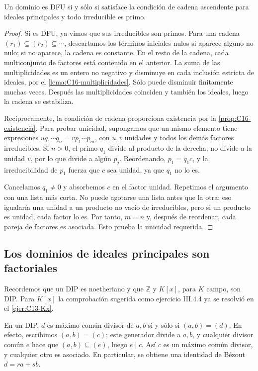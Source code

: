 \begin{teo}\label{teo:C16-criterio}
Un dominio es DFU si y sólo si satisface la condición de cadena ascendente para ideales principales y todo irreducible es primo.
\end{teo}
\begin{proof}
Si es DFU, ya vimos que sus irreducibles son primos. Para una cadena $(r_1)\subseteq(r_2)\subseteq\cdots$, descartamos los términos iniciales nulos si aparece alguno no nulo; si no aparece, la cadena es constante. En el resto de la cadena, cada multiconjunto de factores está contenido en el anterior. La suma de las multiplicidades es un entero no negativo y disminuye en cada inclusión estricta de ideales, por el \cref{lema:C16-multiplicidades}. Sólo puede disminuir finitamente muchas veces. Después las multiplicidades coinciden y también los ideales, luego la cadena se estabiliza.

Recíprocamente, la condición de cadena proporciona existencia por la \cref{prop:C16-existencia}. Para probar unicidad, supongamos que un mismo elemento tiene expresiones $u q_1\cdots q_n=v p_1\cdots p_m$, con $u,v$ unidades y todos los demás factores irreducibles. Si $n>0$, el primo $q_1$ divide al producto de la derecha; no divide a la unidad $v$, por lo que divide a algún $p_j$. Reordenando, $p_1=q_1c$, y la irreducibilidad de $p_1$ fuerza que $c$ sea unidad, ya que $q_1$ no lo es.

Cancelamos $q_1\ne0$ y absorbemos $c$ en el factor unidad. Repetimos el argumento con una lista más corta. No puede agotarse una lista antes que la otra: eso igualaría una unidad a un producto no vacío de irreducibles, pero si un producto es unidad, cada factor lo es. Por tanto, $m=n$ y, después de reordenar, cada pareja de factores es asociada. Esto prueba la unicidad requerida.
\end{proof}

\subsection{Los dominios de ideales principales son factoriales}
Recordemos que un DIP es noetheriano y que $\mathbb Z$ y $K[x]$, para $K$ campo, son DIP. Para $K[x]$ la comprobación sugerida como ejercicio III.4.4 ya se resolvió en el \cref{ejer:C13-Kx}.

En un DIP, $d$ es máximo común divisor de $a,b$ si y sólo si $(a,b)=(d)$. En efecto, escribimos $(a,b)=(c)$; este generador divide a $a,b$, y cualquier divisor común $e$ hace que $(a,b)\subseteq(e)$, luego $e\mid c$. Así $c$ es un máximo común divisor, y cualquier otro es asociado. En particular, se obtiene una identidad de Bézout $d=ra+sb$.

